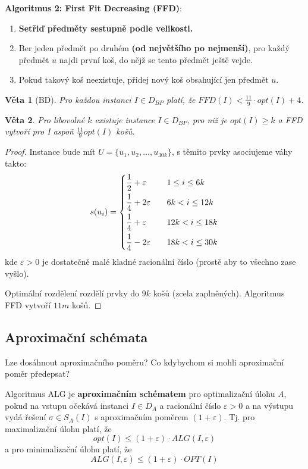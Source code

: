\documentclass[11pt]{report} %
\newtheorem{theorem}{Věta}[section]
\numberwithin{equation}{section}
\begin{document}
\medskip
\noindent\textbf{Algoritmus 2: First Fit Decreasing (FFD)}: 
\begin{enumerate}
	
	
	\item \textbf{Setřiď předměty sestupně podle velikosti.} 
	\item Ber jeden předmět po druhém \textbf{(od největšího po nejmenší)}, pro každý předmět $u$ najdi první koš, do nějž se tento předmět ještě vejde.
	\item Pokud takový koš neexistuje, přidej nový koš obsahující jen předmět $u$.  
\end{enumerate}

\begin{theorem}[BD]
	Pro každou instanci $I \in D_{BP}$ platí, že $FFD(I) < \frac{11}{9} \cdot opt(I) + 4$.
\end{theorem}
\begin{theorem}
	Pro libovolné $k$ existuje instance $I \in D_{BP}$, pro niž je $opt(I) \geq k$ a FFD vytvoří pro I aspoň $\frac{11}{9}opt(I)$ košů.
\end{theorem}
\begin{proof}
	Instance bude mít $U = \{u_1, u_2, \dots, u_{30k}\}$, s těmito prvky asociujeme váhy takto:
	$$
	s(u_i) =
	\begin{dcases}
	\frac{1}{2} + \varepsilon 	&\quad 1 \leq i \leq 6k\\
	\frac{1}{4} + 2\varepsilon 	&\quad 6k < i \leq 12k	\\
	\frac{1}{4} + \varepsilon 	&\quad 12k < i \leq 18k \\
	\frac{1}{4} - 2\varepsilon 	&\quad 18k < i \leq 30k \\
	\end{dcases}
	$$
	kde $\varepsilon > 0$ je dostatečně malé kladné racionální číslo (prostě aby to všechno zase vyšlo).
	
	Optimální rozdělení rozdělí prvky do $9k$ košů (zcela zaplněných). Algoritmus FFD vytvoří $11m$ košů.
\end{proof}


\subsection{Aproximační schémata}
Lze dosáhnout  aproximačního poměru? Co kdybychom si mohli aproximační poměr předepsat?

Algoritmus ALG je \textbf{aproximačním schématem} pro optimalizační úlohu \textit{A}, pokud na vstupu očekává instanci
$I \in D_A$ a racionální číslo $\varepsilon > 0$ a na výstupu vydá řešení $\sigma \in S_A(I)$ s aproximačním poměrem $(1 + \varepsilon)$. Tj. pro maximalizační úlohu platí, že 
$$opt(I) \leq (1 + \varepsilon) \cdot ALG(I, \varepsilon)$$
a pro minimalizační úlohu platí, že
$$ALG(I, \varepsilon) \leq (1 + \varepsilon) \cdot OPT(I)$$
\end{document}
